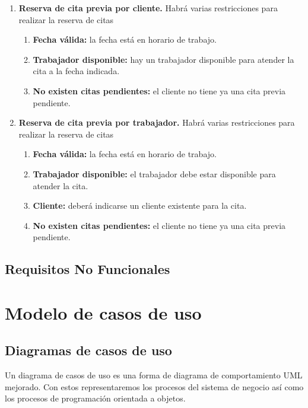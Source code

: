 \begin{enumerate}[leftmargin=1.75cm,start=1,label={\bfseries RS-\arabic*.}]
    \item \textbf{Reserva de cita previa por cliente.} Habrá varias restricciones para realizar la reserva de citas
    \begin{enumerate}[start=1,label={\bfseries RS-4.\arabic*.}]
        \item \textbf{Fecha válida:} la fecha está en horario de trabajo.
        \item \textbf{Trabajador disponible:} hay un trabajador disponible para atender la cita a la fecha indicada.
        \item \textbf{No existen citas pendientes:} el cliente no tiene ya una cita previa pendiente.
    \end{enumerate}

    \item \textbf{Reserva de cita previa por trabajador.} Habrá varias restricciones para realizar la reserva de citas
    \begin{enumerate}[start=1,label={\bfseries RS-4.\arabic*.}]
        \item \textbf{Fecha válida:} la fecha está en horario de trabajo.
        \item \textbf{Trabajador disponible:} el trabajador debe estar disponible para atender la cita.
        \item \textbf{Cliente:} deberá indicarse un cliente existente para la cita.
        \item \textbf{No existen citas pendientes:} el cliente no tiene ya una cita previa pendiente.
    \end{enumerate}
\end{enumerate}

\subsection{Requisitos No Funcionales}

\section{Modelo de casos de uso}

\subsection{Diagramas de casos de uso}

Un diagrama de casos de uso es una forma de diagrama de comportamiento UML mejorado. Con estos representaremos
los procesos del sistema de negocio así como los procesos de programación orientada a objetos.\\

